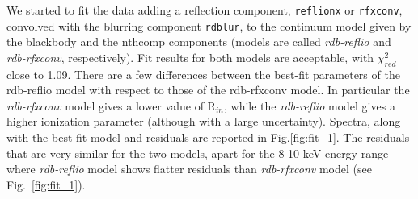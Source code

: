 \documentclass{aa}
\begin{document}
We started to fit the data adding a reflection component, \texttt{reflionx} 
or \texttt{rfxconv}, convolved with the blurring component \texttt{rdblur}, 
to the continuum model given by the blackbody and the nthcomp components
(models are called \emph{rdb-reflio} and \emph{rdb-rfxconv}, respectively). 
Fit results for both models are acceptable, with $\chi_{red}^{2}\,$ close to 1.09. 
There are a few differences between the best-fit parameters of the rdb-reflio 
model with respect to those of the rdb-rfxconv model. In particular the 
\emph{rdb-rfxconv} model gives a lower value of R$_{in}$, while the 
\emph{rdb-reflio} model gives a higher ionization parameter (although 
with a large uncertainty).
Spectra, along with the best-fit model and residuals are reported in 
Fig.\ref{fig:fit_1}. The residuals that are very similar
for the two models, apart for the 8-10 keV energy range where 
\emph{rdb-reflio} model shows flatter residuals than 
\emph{rdb-rfxconv} model (see Fig.\ \ref{fig:fit_1}).
\end{document}
